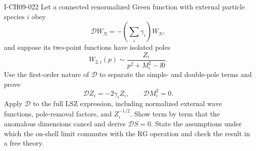 \begin{exercise}{I-CH09-022}
Let a connected renormalized Green function with external particle species
$i$ obey
\[
  \mathcal D W_N=-\left(\sum_i\gamma_i\right)W_N,
\]
and suppose its two-point functions have isolated poles
\[
  W_{2,i}(p)\sim\frac{Z_i}{p^2+M_i^2-\ii0}.
\]
Use the first-order nature of $\mathcal D$ to separate the simple- and
double-pole terms and prove
\[
  \mathcal D Z_i=-2\gamma_iZ_i,
  \qquad \mathcal D M_i^2=0.
\]
Apply $\mathcal D$ to the full LSZ expression, including normalized external
wave functions, pole-removal factors, and $Z_i^{-1/2}$.  Show term by term
that the anomalous dimensions cancel and derive $\mathcal D S=0$.  State the
assumptions under which the on-shell limit commutes with the RG operation and
check the result in a free theory.
\end{exercise}
